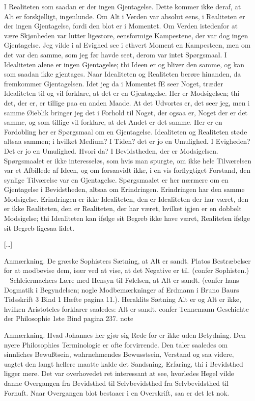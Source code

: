 \documentclass[12pt,a4paper]{article}
\begin{document}
I Realiteten som saadan er der ingen Gjentagelse. Dette kommer ikke deraf, at Alt er forskjelligt, ingenlunde. Om Alt i Verden var absolut eens, i Realiteten er der ingen Gjentagelse, fordi den blot er i Momentet. Om Verden istedenfor at være Skjønheden var lutter ligestore, eensformige Kampestene, der var dog ingen Gjentagelse. Jeg vilde i al Evighed see i ethvert Moment en Kampesteen, men om det var den samme, som jeg før havde seet, derom var intet Spørgsmaal. I Idealiteten alene er ingen Gjentagelse; thi Ideen er og bliver den samme, og kan som saadan ikke gjentages. Naar Idealiteten og Realiteten berøre hinanden, da fremkommer Gjentagelsen. Idet jeg da i Momentet fE seer Noget, træder Idealiteten til og vil forklare, at det er en Gjentagelse. Her er Modsigelsen; thi det, der er, er tillige paa en anden Maade. At det Udvortes er, det seer jeg, men i samme Øieblik bringer jeg det i Forhold til Noget, der ogsaa er, Noget der er det samme, og som tillige vil forklare, at det Andet er det samme. Her er en Fordobling her er Spørgsmaal om en Gjentagelse. Idealiteten og Realiteten støde altsaa sammen; i hvilket Medium? I Tiden? det er jo en Umulighed. I Evigheden? Det er jo en Umulighed. Hvori da? I Bevidstheden, der er Modsigelsen. Spørgsmaalet er ikke interesseløs, som hvis man spurgte, om ikke hele Tilværelsen var et Afbillede af Ideen, og om forsaavidt ikke, i en vis forflygtiget Forstand, den synlige Tilværelse var en Gjentagelse. Spørgsmaalet er her nærmere om en Gjentagelse i Bevidstheden, altsaa om Erindringen. Erindringen har den samme Modsigelse. Erindringen er ikke Idealiteten, den er Idealiteten der har været, den er ikke Realiteten, den er Realiteten, der har været, hvilket igjen er en dobbelt Modsigelse; thi Idealiteten kan ifølge sit Begreb ikke have været, Realiteten ifølge sit Begreb ligesaa lidet.

[…]

Anmærkning. De græske Sophisters Sætning, at Alt er sandt. Platos Bestræbelser for at modbevise dem, især ved at vise, at det Negative er til. (confer Sophisten.) – Schleiermachers Lære med Hensyn til Følelsen, at Alt er sandt. (confer hans Dogmatik i Begyndelsen; nogle Modbemærkninger af Erdmann i Bruno Baurs Tidsskrift 3 Bind 1 Hæfte pagina 11.). Heraklits Sætning Alt er og Alt er ikke, hvilken Aristoteles forklarer saaledes: Alt er sandt. confer Tennemann Geschichte der Philosophie 1ste Bind pagina 237. note

Anmærkning. Hvad Johannes her gjør sig Rede for er ikke uden Betydning. Den nyere Philosophies Terminologie er ofte forvirrende. Den taler saaledes om sinnliches Bewußtsein, wahrnehmendes Bewusstsein, Verstand og saa videre, uagtet den langt hellere maatte kalde det Sandsning, Erfaring, thi i Bevidsthed ligger mere. Det var overhovedet ret interessant at see, hvorledes Hegel vilde danne Overgangen fra Bevidsthed til Selvbevidsthed fra Selvbevidsthed til Fornuft. Naar Overgangen blot bestaaer i en Overskrift, saa er det let nok.
\end{document}
